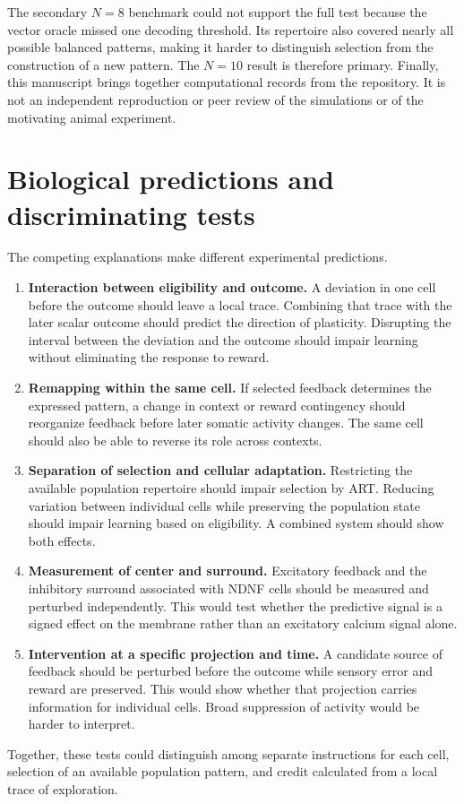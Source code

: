 \documentclass[11pt]{article}
\begin{document}
The secondary $N=8$ benchmark could not support the full test because the vector oracle missed one decoding threshold. Its repertoire also covered nearly all possible balanced patterns, making it harder to distinguish selection from the construction of a new pattern. The $N=10$ result is therefore primary. Finally, this manuscript brings together computational records from the repository. It is not an independent reproduction or peer review of the simulations or of the motivating animal experiment.

\section{Biological predictions and discriminating tests}
The competing explanations make different experimental predictions.
\begin{enumerate}
\item \textbf{Interaction between eligibility and outcome.} A deviation in one cell before the outcome should leave a local trace. Combining that trace with the later scalar outcome should predict the direction of plasticity. Disrupting the interval between the deviation and the outcome should impair learning without eliminating the response to reward.
\item \textbf{Remapping within the same cell.} If selected feedback determines the expressed pattern, a change in context or reward contingency should reorganize feedback before later somatic activity changes. The same cell should also be able to reverse its role across contexts.
\item \textbf{Separation of selection and cellular adaptation.} Restricting the available population repertoire should impair selection by ART. Reducing variation between individual cells while preserving the population state should impair learning based on eligibility. A combined system should show both effects.
\item \textbf{Measurement of center and surround.} Excitatory feedback and the inhibitory surround associated with NDNF cells should be measured and perturbed independently. This would test whether the predictive signal is a signed effect on the membrane rather than an excitatory calcium signal alone.
\item \textbf{Intervention at a specific projection and time.} A candidate source of feedback should be perturbed before the outcome while sensory error and reward are preserved. This would show whether that projection carries information for individual cells. Broad suppression of activity would be harder to interpret.
\end{enumerate}
Together, these tests could distinguish among separate instructions for each cell, selection of an available population pattern, and credit calculated from a local trace of exploration.
\end{document}
